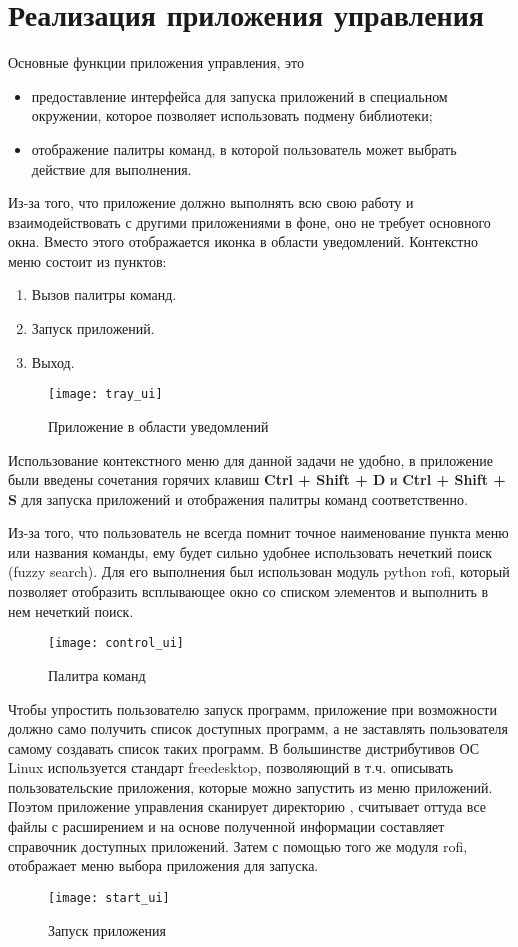 \section{Реализация приложения управления}

Основные функции приложения управления, это
\begin{itemize}
    \item предоставление интерфейса для запуска приложений в специальном
    окружении, которое позволяет использовать подмену библиотеки;
    \item отображение палитры команд, в которой пользователь может выбрать
    действие для выполнения.
\end{itemize}

Из-за того, что приложение должно выполнять всю свою работу и взаимодействовать
с другими приложениями в фоне, оно не требует основного окна. Вместо этого
отображается иконка в области уведомлений. Контекстно меню состоит из пунктов:

\begin{enumerate}
    \item Вызов палитры команд.
    \item Запуск приложений.
    \item Выход.
\end{enumerate}

\begin{figure}[h]
    \centering
    \texttt{[image: tray\_ui]}
    \caption{Приложение в области уведомлений}
\end{figure}

Использование контекстного меню для данной задачи не удобно, в приложение
были введены сочетания горячих клавиш \textbf{Ctrl + Shift + D} и
\textbf{Ctrl + Shift + S} для запуска приложений и отображения палитры команд
соответственно.

Из-за того, что пользователь не всегда помнит точное наименование пункта меню
или названия команды, ему будет сильно удобнее использовать нечеткий поиск
(fuzzy search). Для его выполнения был использован модуль python rofi, который
позволяет отобразить всплывающее окно со списком элементов и выполнить в нем
нечеткий поиск.

\begin{figure}[h]
    \centering
    \texttt{[image: control\_ui]}
    \caption{Палитра команд}
\end{figure}

Чтобы упростить пользователю запуск программ, приложение при возможности должно
само получить список доступных программ, а не заставлять пользователя самому
создавать список таких программ. В большинстве дистрибутивов ОС Linux
используется стандарт freedesktop, позволяющий в т.ч. описывать пользовательские
приложения, которые можно запустить из меню приложений. Поэтом приложение
управления сканирует директорию , считывает оттуда
все файлы с расширением  и на основе полученной информации
составляет справочник доступных приложений. Затем с помощью того же модуля rofi,
отображает меню выбора приложения для запуска.

\begin{figure}[h]
    \centering
    \texttt{[image: start\_ui]}
    \caption{Запуск приложения}
\end{figure}
